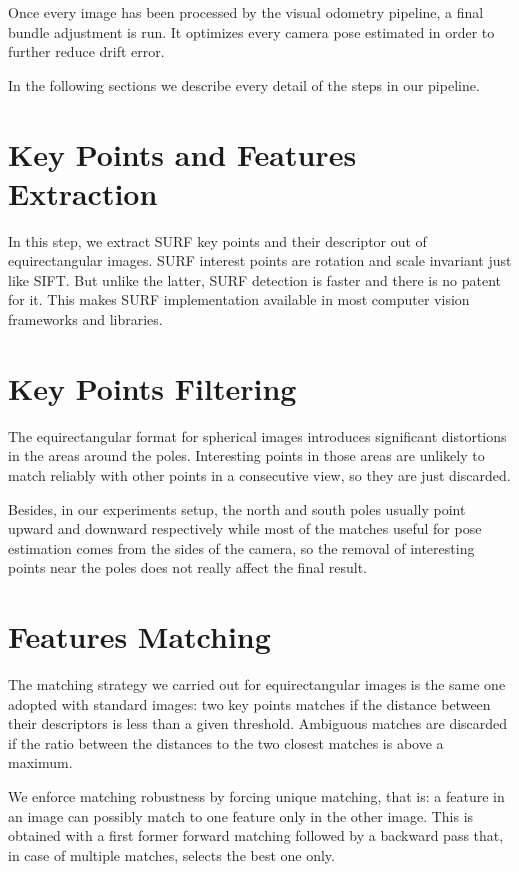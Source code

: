 Once every image has been processed by the visual odometry pipeline, a final 
bundle adjustment is run. It optimizes every camera pose estimated in order to 
further reduce drift error.

In the following sections we describe every detail of the steps in our pipeline.

\section{Key Points and Features Extraction}
In this step, we extract SURF key points and their descriptor out of 
equirectangular images. SURF 
interest points are rotation and scale invariant just like SIFT. But unlike 
the latter, SURF detection is faster and there is no patent for it. 
This makes SURF implementation available in most computer vision frameworks and 
libraries.

\section{Key Points Filtering}
The equirectangular format for spherical images introduces significant 
distortions in the areas around the poles. Interesting points in those areas 
are unlikely to match reliably with other points in a consecutive view, 
so they are just discarded.

Besides, in our experiments setup, the north and south poles usually point 
upward and downward respectively while most of the matches useful for pose 
estimation comes from the sides of the camera, so the removal of interesting 
points near the poles does not really affect the final result.

\section{Features Matching}
The matching strategy we carried out for equirectangular images is the same one 
adopted with standard images: two key points matches if the distance between 
their descriptors is less than a given threshold. Ambiguous matches 
are discarded if the ratio between the distances to the two closest matches is 
above a maximum.

We enforce matching robustness by forcing unique matching, that is: a feature 
in an image can possibly match to one feature only in the other image.
This is obtained with a first former forward matching followed by a backward 
pass that, in case of multiple matches, selects the best one only.

